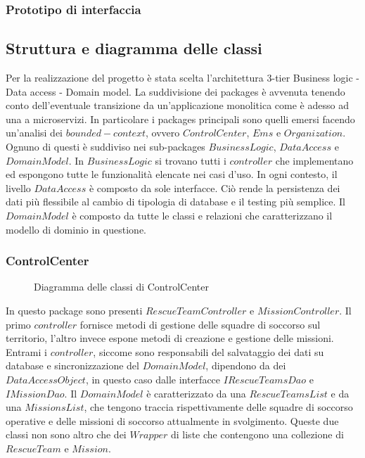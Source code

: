 \documentclass{article}
\begin{document}
    \subsubsection{Prototipo di interfaccia}
    \subsection{Struttura e diagramma delle classi}
    Per la realizzazione del progetto è stata scelta l'architettura 3-tier Business logic - Data access - Domain model.
    La suddivisione dei packages è avvenuta tenendo conto dell'eventuale transizione da un'applicazione monolitica come è adesso ad una a microservizi.
    In particolare i packages principali sono quelli emersi facendo un'analisi dei $bounded-context$, ovvero $ControlCenter$, $Ems$ e $Organization$.
    Ognuno di questi è suddiviso nei sub-packages $BusinessLogic$, $DataAccess$ e $DomainModel$.
    \newline In $BusinessLogic$ si trovano tutti i $controller$ che implementano ed espongono tutte le funzionalità elencate nei casi d'uso.
    \newline In ogni contesto, il livello $DataAccess$ è composto da sole interfacce. Ciò rende la persistenza dei dati più flessibile al cambio di tipologia di database e il testing più semplice.
    \newline Il $DomainModel$ è composto da tutte le classi e relazioni che caratterizzano il modello di dominio in questione.

    \subsubsection{ControlCenter}
    \begin{figure}
        \centering
        
        \caption{Diagramma delle classi di ControlCenter}
        \label{fig:uml-controlcenter}
    \end{figure}
    In questo package sono presenti $RescueTeamController$ e $MissionController$. Il primo $controller$ fornisce metodi di gestione delle squadre di soccorso sul territorio,
    l'altro invece espone metodi di creazione e gestione delle missioni.
    Entrami i $controller$, siccome sono responsabili del salvataggio dei dati su database e sincronizzazione del $DomainModel$, dipendono da dei $DataAccessObject$, in questo caso dalle interfacce $IRescueTeamsDao$ e $IMissionDao$.
    Il $DomainModel$ è caratterizzato da una $RescueTeamsList$ e da una $MissionsList$, che tengono traccia rispettivamente delle squadre di soccorso operative e delle missioni di soccorso attualmente in svolgimento.
    Queste due classi non sono altro che dei $Wrapper$ di liste che contengono una collezione di $RescueTeam$ e $Mission$.
\end{document}
